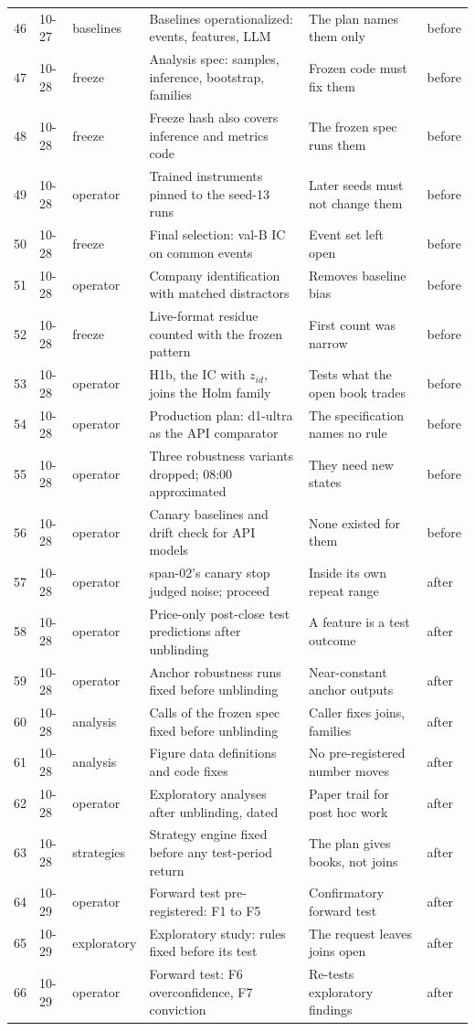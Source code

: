 \begin{longtable}{@{}rll>{\raggedright\arraybackslash}p{2.85in}>{\raggedright\arraybackslash}p{1.7in}l@{}}
46 & 10-27 & baselines & Baselines operationalized: events, features, LLM & The plan names them only & before \\
47 & 10-28 & freeze & Analysis spec: samples, inference, bootstrap, families & Frozen code must fix them & before \\
48 & 10-28 & freeze & Freeze hash also covers inference and metrics code & The frozen spec runs them & before \\
49 & 10-28 & operator & Trained instruments pinned to the seed-13 runs & Later seeds must not change them & before \\
50 & 10-28 & freeze & Final selection: val-B IC on common events & Event set left open & before \\
51 & 10-28 & operator & Company identification with matched distractors & Removes baseline bias & before \\
52 & 10-28 & freeze & Live-format residue counted with the frozen pattern & First count was narrow & before \\
53 & 10-28 & operator & H1b, the IC with $z_{id}$, joins the Holm family & Tests what the open book trades & before \\
54 & 10-28 & operator & Production plan: d1-ultra as the API comparator & The specification names no rule & before \\
55 & 10-28 & operator & Three robustness variants dropped; 08:00 approximated & They need new states & before \\
56 & 10-28 & operator & Canary baselines and drift check for API models & None existed for them & before \\
57 & 10-28 & operator & span-02's canary stop judged noise; proceed & Inside its own repeat range & after \\
58 & 10-28 & operator & Price-only post-close test predictions after unblinding & A feature is a test outcome & after \\
59 & 10-28 & operator & Anchor robustness runs fixed before unblinding & Near-constant anchor outputs & after \\
60 & 10-28 & analysis & Calls of the frozen spec fixed before unblinding & Caller fixes joins, families & after \\
61 & 10-28 & analysis & Figure data definitions and code fixes & No pre-registered number moves & after \\
62 & 10-28 & operator & Exploratory analyses after unblinding, dated & Paper trail for post hoc work & after \\
63 & 10-28 & strategies & Strategy engine fixed before any test-period return & The plan gives books, not joins & after \\
64 & 10-29 & operator & Forward test pre-registered: F1 to F5 & Confirmatory forward test & after \\
65 & 10-29 & exploratory & Exploratory study: rules fixed before its test & The request leaves joins open & after \\
66 & 10-29 & operator & Forward test: F6 overconfidence, F7 conviction & Re-tests exploratory findings & after \\
\end{longtable}
